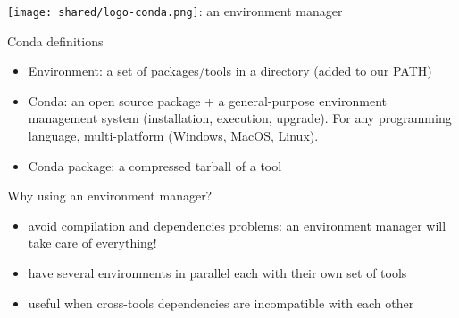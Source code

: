 %
\begin{frame}{\texttt{[image: shared/logo-conda.png]}: an environment manager}
\begin{block}{Conda definitions}
    \begin{itemize}
        \item Environment: a set of packages/tools in a directory (added to our PATH)
        \item Conda: an open source package + a general-purpose environment management system (installation, execution, upgrade). For any programming language, multi-platform (Windows, MacOS, Linux).
        \item Conda package: a compressed tarball of a tool
    \end{itemize}
\end{block}
\begin{block}{Why using an environment manager?}
\begin{itemize}
    \item avoid compilation and dependencies problems: an environment manager will take care of everything!
    \item have several environments in parallel each with their own set of tools
    \item useful when cross-tools dependencies are incompatible with each other
\end{itemize}
\end{block}
\end{frame}
